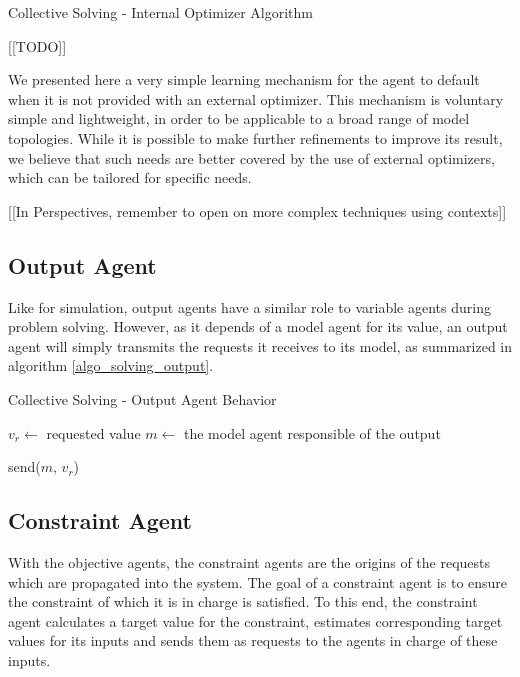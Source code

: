 \begin{algorithm}
\caption{Collective Solving - Internal Optimizer Algorithm}
\label{algo_solving_internaloptim}
	[[TODO]]\;
\end{algorithm}

We presented here a very simple learning mechanism for the agent to default when it is not provided with an external optimizer. This mechanism is voluntary simple and lightweight, in order to be applicable to a broad range of model topologies. While it is possible to make further refinements to improve its result, we believe that such needs are better covered by the use of external optimizers, which can be tailored for specific needs.

[[In Perspectives, remember to open on more complex techniques using contexts]]

\subsection{Output Agent}

Like for simulation, output agents have a similar role to variable agents during problem solving. However, as it depends of a model agent for its value, an output agent will simply transmits the requests it receives to its model, as summarized in algorithm \ref{algo_solving_output}.

\begin{algorithm}
\caption{Collective Solving - Output Agent Behavior}
\label{algo_solving_output}

	$v_r \leftarrow$ requested value\;
	$m \leftarrow$ the model agent responsible of the output \;
	
	send($m$, $v_r$) \;
	
\end{algorithm}

\subsection{Constraint Agent}

With the objective agents, the constraint agents are the origins of the requests which are propagated into the system. The goal of a constraint agent is to ensure the constraint of which it is in charge is satisfied. To this end, the constraint agent calculates a target value for the constraint, estimates corresponding target values for its inputs and sends them as requests to the agents in charge of these inputs.

